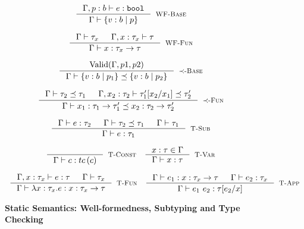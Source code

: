 \begin{figure}[ht!]


$$\inference
    {\hastype{\Gamma, p:b}{\reft}{\tbbool}}
    {\isWellFormed{\Gamma}{\tref{b}{p}}}
    [\wtBase]
$$

$$
\inference
    {
    \isWellFormed{\Gamma}{\tau_x} &&
	\isWellFormed{\Gamma, x:\tau_x}{\tau}
    }
    {\isWellFormed{\Gamma}{\tfun{x}{\tau_x}{\tau}}}
    [\wtFun]
$$


\medskip {}

$$
\inference
   {\text{Valid}(\Gamma, p1, p2)}
   {\isSubType{\Gamma}{\tref{b}{p_1}}{\tref{b}{p_2}}}
   [\tsubBase]
$$

$$
\inference
   {\isSubType{\Gamma}{\tau_2}{\tau_1} &
	\isSubType{\Gamma, x_2:{\tau_2}}{\SUBST{\tau_1'}{x_1}{x_2}}{\tau_2'}	
   }
   {\isSubType{\Gamma}
	  {\tfun{x_1}{\tau_1}{\tau_1'}}
	  {\tfun{x_2}{\tau_2}{\tau_2'}}
}[\tsubFun]
$$


\medskip {}

$$\begin{array}{cc}

\inference
  {  \hastype{\Gamma}{e}{\tau_2} && \isSubType{\Gamma}{\tau_2}{\tau_1} 
  && \isWellFormed{\Gamma}{\tau_1}
  }
  {\hastype{\Gamma}{e}{\tau_1}}
  [\tsub]
\end{array}$$

$$\begin{array}{cc}

\inference
  {}
  {\hastype{\Gamma}{c}{\tc{c}}}
  [\tconst]
&
\inference
  {x:\tau \in \Gamma}
  {\hastype{\Gamma}{x}{\tau}} 
  [\tvariable]

\end{array}$$

$$\begin{array}{cc}

\inference
  {\hastype{\Gamma, x:\tau_x}{e}{\tau} &&     
  \isWellFormed{\Gamma}{\tau_x}
  }
  {\hastype{\Gamma}{\efunt{x}{\tau_x}{e}}{\tfun{x}{\tau_x}{\tau}}}
  [\tfunction]
&
\inference
  {\hastype{\Gamma}{e_1}{\tfun{x}{\tau_x}{\tau}} &&
   \hastype{\Gamma}{e_2}{\tau_x}
  }
  {\hastype{\Gamma}{\eapp{e_1}{e_2}}{\tau[e_2/x]}} 
  [\tapp]

\end{array}$$

\caption{\textbf{Static Semantics: Well-formedness, Subtyping and Type Checking}}
\label{fig:rules}
\end{figure}

